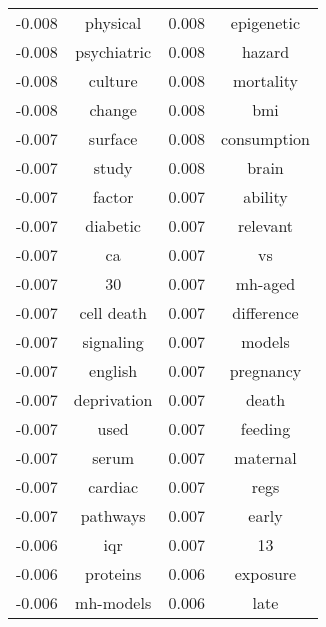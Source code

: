 \documentclass[paper=a4, fontsize=11pt]{scrartcl} %
\numberwithin{equation}{section} %
\numberwithin{figure}{section} %
\numberwithin{table}{section} %
\begin{document}
\begin{table}
\begin{tabular}{l c | l c}
-0.008 & physical & 0.008 & epigenetic \\
-0.008 & psychiatric & 0.008 & hazard \\
-0.008 & culture & 0.008 & mortality \\
-0.008 & change & 0.008 & bmi \\
-0.007 & surface & 0.008 & consumption \\
-0.007 & study & 0.008 & brain \\
-0.007 & factor & 0.007 & ability \\
-0.007 & diabetic & 0.007 & relevant \\
-0.007 & ca & 0.007 & vs \\
-0.007 & 30 & 0.007 & mh-aged \\
-0.007 & cell death & 0.007 & difference \\
-0.007 & signaling & 0.007 & models \\
-0.007 & english & 0.007 & pregnancy \\
-0.007 & deprivation & 0.007 & death \\
-0.007 & used & 0.007 & feeding \\
-0.007 & serum & 0.007 & maternal \\
-0.007 & cardiac & 0.007 & regs \\
-0.007 & pathways & 0.007 & early \\
-0.006 & iqr & 0.007 & 13 \\
-0.006 & proteins & 0.006 & exposure \\
-0.006 & mh-models & 0.006 & late \\
\end{tabular}
\end{table}
\end{document}

